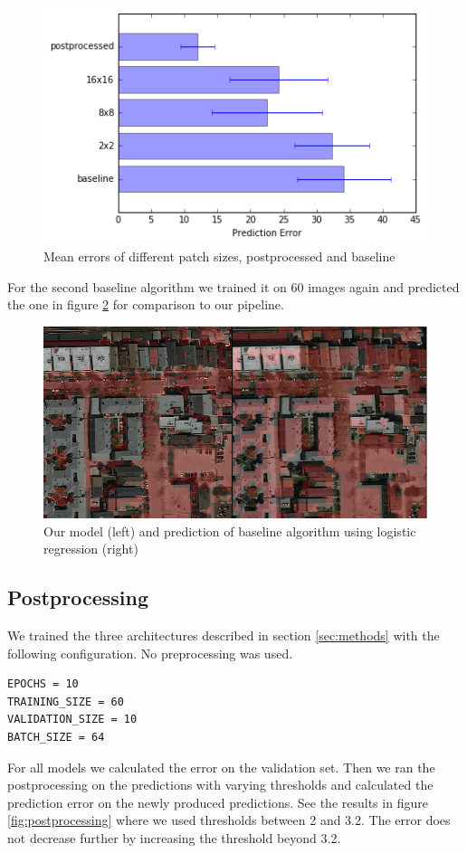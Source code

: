 \documentclass[10pt,conference,compsocconf]{IEEEtran}
\begin{document}
\begin{figure}
	\centering
	\includegraphics[width=.8\columnwidth]{pictures/baseline}
	\caption{Mean errors of different patch sizes, postprocessed and baseline}
	\label{fig:baseline}
\end{figure}

For the second baseline algorithm we trained it on 60 images again and predicted the one in figure \ref{fig:scikit} for comparison to our pipeline.

\begin{figure}
	\includegraphics[width=\columnwidth]{pictures/baseline1-comp}
	\caption{Our model (left) and prediction of baseline algorithm using logistic regression (right)}
	\label{fig:scikit}
\end{figure}

\subsection{Postprocessing}
We trained the three architectures described in section \ref{sec:methods} with the following configuration. No preprocessing was used.
\begin{lstlisting}
EPOCHS = 10
TRAINING_SIZE = 60
VALIDATION_SIZE = 10
BATCH_SIZE = 64
\end{lstlisting}
For all models we calculated the error on the validation set. Then we ran the postprocessing on the predictions with varying thresholds and calculated the prediction error on the newly produced predictions. See the results in figure \ref{fig:postprocessing} where we used thresholds between 2 and 3.2. The error does not decrease further by increasing the threshold beyond 3.2.
\end{document}

